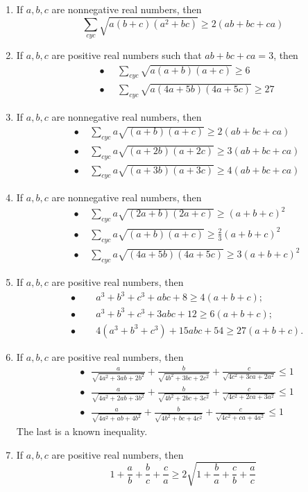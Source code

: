 \documentclass{article}
\begin{document}
\begin{enumerate}
 \item If $a,b,c$ are nonnegative real numbers, then
\[\sum_{cyc}\sqrt{a(b+c)(a^2+bc)}\ge 2(ab+bc+ca)\]

  \item If $a,b,c$ are positive real numbers such that $ab+bc+ca=3$, then
\[\begin{aligned}&\bullet \ \ \ \ \ \  \sum_{cyc}\sqrt{a(a+b)(a+c)}\ge 6\\&\bullet\ \ \ \ \ \  \sum_{cyc}\sqrt{a(4a+5b)(4a+5c)}\ge 27\end{aligned}\]

 \item If $a,b,c$ are nonnegative real numbers, then
\[\begin{aligned}&\bullet\ \ \ \ \ \sum_{cyc} a\sqrt{(a+b)(a+c)}\ge 2(ab+bc+ca)\\&\bullet\ \ \ \ \ \sum_{cyc} a\sqrt{(a+2b)(a+2c)}\ge 3(ab+bc+ca)\\&\bullet\ \ \ \ \ \sum_{cyc} a\sqrt{(a+3b)(a+3c)}\ge 4(ab+bc+ca)\end{aligned}\]

 \item If $a,b,c$ are nonnegative real numbers, then
\[\begin{aligned}&\bullet\ \ \ \ \ \sum_{cyc} a\sqrt{(2a+b)(2a+c)}\ge (a+b+c)^2\\ &\bullet\ \ \ \ \ \sum_{cyc} a\sqrt{(a+b)(a+c)}\ge \frac 2{3}(a+b+c)^2\\ &\bullet\ \ \ \ \ \sum_{cyc} a\sqrt{(4a+5b)(4a+5c)}\ge  3(a+b+c)^2\end{aligned}\]

 \item  If $a,b,c$ are positive real numbers, then
\[\begin{aligned}&\bullet\quad \ \ \ \ \ a^3+b^3+c^3+abc+8\ge 4(a+b+c);\\&\bullet \quad \ \ \ \ \ a^3+b^3+c^3+3abc+12\ge 6(a+b+c);\\ &\bullet \quad \ \ \ \ \ 4(a^3+b^3+c^3)+15abc+54\ge 27(a+b+c).\end{aligned}\]

 \item  If $a,b,c$ are positive real numbers, then
\[ \begin{aligned}&\bullet\ \ \  \frac  a{\sqrt{4a^2+3ab+2b^2}}+\frac  b{\sqrt{4b^2+3bc+2c^2}}+\frac  c{\sqrt{4c^2+3ca+2a^2}}\le 1\\ &\bullet\ \ \  \frac  a{\sqrt{4a^2+2ab+3b^2}}+\frac  b{\sqrt{4b^2+2bc+3c^2}}+\frac  c{\sqrt{4c^2+2ca+3a^2}}\le 1\\&\bullet \ \ \  \frac  a{\sqrt{4a^2+ab+4b^2}}+\frac  b{\sqrt{4b^2+bc+4c^2}}+\frac  c{\sqrt{4c^2+ca+4a^2}}\le 1\end{aligned}\]
The last is a known inequality.
 \item  If $a,b,c$ are positive real numbers, then
\[1+\frac  a{b}+\frac  b{c}+\frac  c{a}\ge 2\sqrt{1+\frac  b{a}+\frac  c{b}+\frac  a{c}}\]


\end{enumerate}
\end{document}
